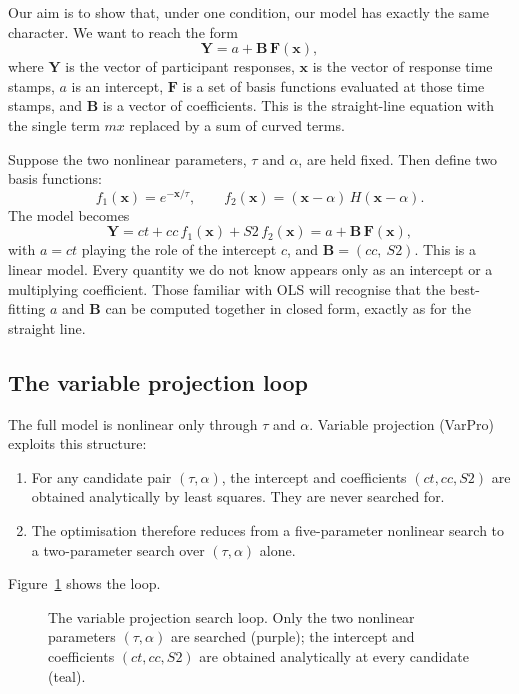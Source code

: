 \documentclass[11pt,a4paper]{article}
\begin{document}
Our aim is to show that, under one condition, our model has exactly the
same character. We want to reach the form
\begin{equation}
\mathbf{Y} = a + \mathbf{B}\,\mathbf{F}(\mathbf{x}),
\end{equation}
where $\mathbf{Y}$ is the vector of participant responses, $\mathbf{x}$ is
the vector of response time stamps, $a$ is an intercept, $\mathbf{F}$ is a
set of basis functions evaluated at those time stamps, and $\mathbf{B}$ is
a vector of coefficients. This is the straight-line equation with the
single term $mx$ replaced by a sum of curved terms.

Suppose the two nonlinear parameters, $\tau$ and $\alpha$, are held fixed.
Then define two basis functions:
\begin{equation}
f_1(\mathbf{x}) = e^{-\mathbf{x}/\tau}, \qquad
f_2(\mathbf{x}) = (\mathbf{x}-\alpha)\,H(\mathbf{x}-\alpha).
\end{equation}
The model becomes
\begin{equation}
\mathbf{Y} = ct + cc\,f_1(\mathbf{x}) + S2\,f_2(\mathbf{x})
           = a + \mathbf{B}\,\mathbf{F}(\mathbf{x}),
\end{equation}
with $a = ct$ playing the role of the intercept $c$, and
$\mathbf{B} = (cc,\ S2)$. This is a linear model. Every quantity we do not
know appears only as an intercept or a multiplying coefficient. Those
familiar with OLS will recognise that the best-fitting $a$ and
$\mathbf{B}$ can be computed together in closed form, exactly as for the
straight line.

\subsection{The variable projection loop}
The full model is nonlinear only through $\tau$ and $\alpha$. Variable
projection (VarPro) exploits this structure:
\begin{enumerate}[nosep]
\item For any candidate pair $(\tau, \alpha)$, the intercept and
  coefficients $(ct, cc, S2)$ are obtained analytically by least squares.
  They are never searched for.
\item The optimisation therefore reduces from a five-parameter nonlinear
  search to a two-parameter search over $(\tau, \alpha)$ alone.
\end{enumerate}
Figure~\ref{fig:loop} shows the loop.

\begin{figure}[ht]
\centering

\caption{The variable projection search loop. Only the two nonlinear
parameters $(\tau,\alpha)$ are searched (purple); the intercept and
coefficients $(ct, cc, S2)$ are obtained analytically at every candidate
(teal).}
\label{fig:loop}
\end{figure}
\end{document}
